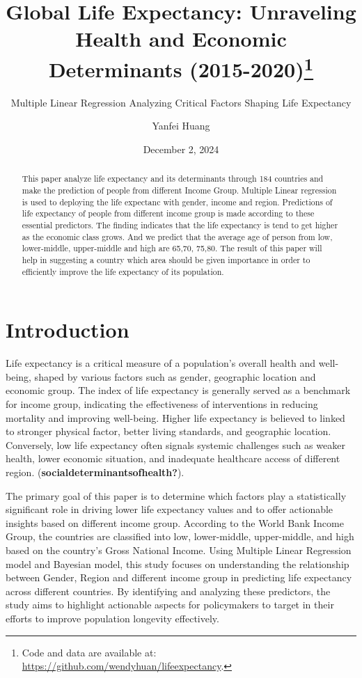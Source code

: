 \documentclass[
  letterpaper,
  DIV=11,
  numbers=noendperiod]{scrartcl}
\title{Global Life Expectancy: Unraveling Health and Economic
Determinants (2015-2020)\thanks{Code and data are available at:
\url{https://github.com/wendyhuan/lifeexpectancy}.}}
\subtitle{Multiple Linear Regression Analyzing Critical Factors Shaping
Life Expectancy}
\author{Yanfei Huang}
\date{December 2, 2024}
\renewcommand*\contentsname{Table of contents}
\newcommand\contentsname{Table of contents}
\begin{document}
\maketitle
\begin{abstract}
This paper analyze life expectancy and its determinants through 184
countries and make the prediction of people from different Income Group.
Multiple Linear regression is used to deploying the life expectanc with
gender, income and region. Predictions of life expectancy of people from
different income group is made according to these essential predictors.
The finding indicates that the life expectancy is tend to get higher as
the economic class grows. And we predict that the average age of person
from low, lower-middle, upper-middle and high are 65,70, 75,80. The
result of this paper will help in suggesting a country which area should
be given importance in order to efficiently improve the life expectancy
of its population.
\end{abstract}

\renewcommand*\contentsname{Table of contents}
{
\hypersetup{linkcolor=}
\setcounter{tocdepth}{3}
\tableofcontents
}

\section{Introduction}\label{introduction}

Life expectancy is a critical measure of a population's overall health
and well-being, shaped by various factors such as gender, geographic
location and economic group. The index of life expectancy is generally
served as a benchmark for income group, indicating the effectiveness of
interventions in reducing mortality and improving well-being. Higher
life expectancy is believed to linked to stronger physical factor,
better living standards, and geographic location. Conversely, low life
expectancy often signals systemic challenges such as weaker health,
lower economic situation, and inadequate healthcare access of different
region. (\textbf{socialdeterminantsofhealth?}).

The primary goal of this paper is to determine which factors play a
statistically significant role in driving lower life expectancy values
and to offer actionable insights based on different income group.
According to the World Bank Income Group, the countries are classified
into low, lower-middle, upper-middle, and high based on the country's
Gross National Income. Using Multiple Linear Regression model and
Bayesian model, this study focuses on understanding the relationship
between Gender, Region and different income group in predicting life
expectancy across different countries. By identifying and analyzing
these predictors, the study aims to highlight actionable aspects for
policymakers to target in their efforts to improve population longevity
effectively.
\end{document}
